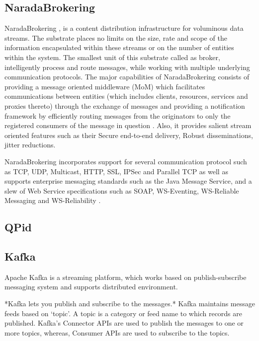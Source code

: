 \subsection{NaradaBrokering}

     NaradaBrokering \cite{www-narada}, is a content distribution
     infrastructure for voluminous data streams. The substrate places
     no limits on the size, rate and scope of the information
     encapsulated within these streams or on the number of entities
     within the system. The smallest unit of this substrate called as
     broker, intelligently process and route messages, while working
     with multiple underlying communication protocols. The major
     capabilities of NaradaBrokering consists of providing a message
     oriented middleware (MoM) which facilitates communications
     between entities (which includes clients, resources, services and
     proxies thereto) through the exchange of messages and providing a
     notification framework by efficiently routing messages from the
     originators to only the registered consumers of the message in
     question \cite{paper-nb-sustrate}. Also, it provides salient
     stream oriented features such as their Secure end-to-end
     delivery, Robust disseminations, jitter reductions.

     NaradaBrokering incorporates support for several communication
     protocol such as TCP, UDP, Multicast, HTTP, SSL, IPSec and
     Parallel TCP as well as supports enterprise messaging standards
     such as the Java Message Service, and a slew of Web Service
     specifications such as SOAP, WS-Eventing, WS-Reliable Messaging
     and WS-Reliability \cite{www-narada-features}.

     
\subsection{QPid}
\subsection{Kafka}

     Apache Kafka is a streaming platform, which works based on
     publish-subscribe messaging system and supports distributed
     environment.
      
     *Kafka lets you publish and subscribe to the messages.* Kafka
     maintains message feeds based on ‘topic’. A topic is a category
     or feed name to which records are published. Kafka’s Connector
     APIs are used to publish the messages to one or more topics,
     whereas, Consumer APIs are used to subscribe to the topics.

